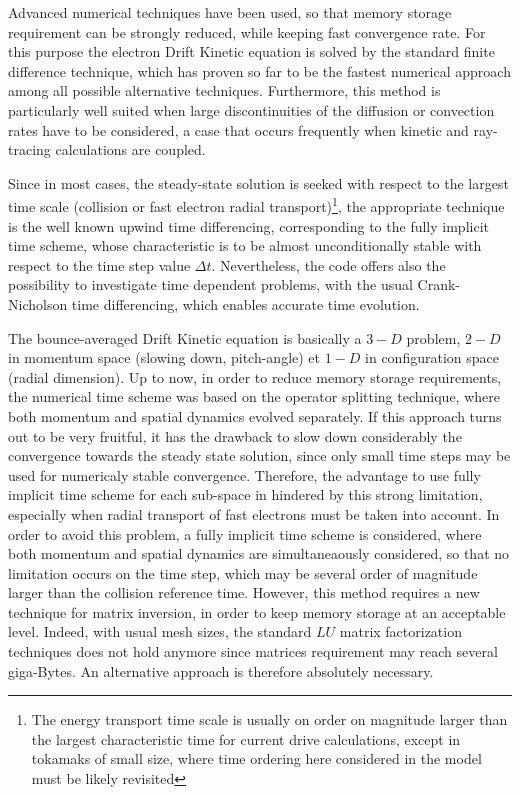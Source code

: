 Advanced numerical techniques have been used, so that memory storage
requirement can be strongly reduced, while keeping fast convergence rate.
For this purpose the electron Drift Kinetic equation is solved by the
standard finite difference technique, which has proven so far to be the
fastest numerical approach among all possible alternative techniques.
Furthermore, this method is particularly well suited when large
discontinuities of the diffusion or convection rates have to be considered,
a case that occurs frequently when kinetic and ray-tracing calculations are
coupled.

Since in most cases, the steady-state solution is seeked with respect to the
largest time scale (collision or fast electron radial
transport)\footnote{The energy transport time scale is usually on
order on magnitude larger than the largest characteristic time for
current drive calculations, except in tokamaks of small size, where
time ordering here considered in the model must be likely revisited}, the appropriate
technique is the well known upwind time differencing, corresponding to the
fully implicit time scheme, whose characteristic is to be almost
unconditionally stable with respect to the time step value $\Delta t$. Nevertheless, the
code offers also the possibility to investigate time dependent problems,
with the usual Crank-Nicholson time differencing, which enables accurate
time evolution.

The bounce-averaged Drift Kinetic equation is basically a $3-D$ problem, $%
2-D $ in momentum space (slowing down, pitch-angle) et $1-D$ in
configuration space (radial dimension). Up to now, in order to reduce memory
storage requirements, the numerical time scheme was based on the operator
splitting technique, where both momentum and spatial dynamics evolved
separately. If this approach turns out to be very fruitful, it has the
drawback to slow down considerably the convergence towards the steady state
solution, since only small time steps may be used for numericaly stable
convergence. Therefore, the advantage to use fully implicit time scheme for
each sub-space in hindered by this strong limitation, especially when radial
transport of fast electrons must be taken into account. In order to avoid
this problem, a fully implicit time scheme is considered, where both
momentum and spatial dynamics are simultaneaously considered, so that no
limitation occurs on the time step, which may be several order of magnitude
larger than the collision reference time. However, this method requires a
new technique for matrix inversion, in order to keep memory storage at an
acceptable level. Indeed, with usual mesh sizes, the standard $LU$ matrix
factorization techniques does not hold anymore since matrices requirement
may reach several giga-Bytes. An alternative approach is therefore
absolutely necessary.


